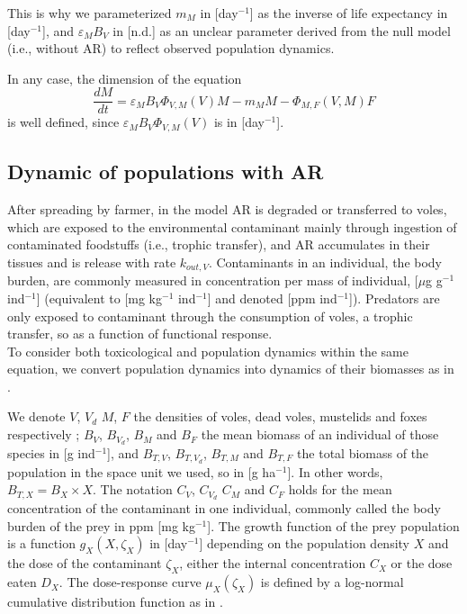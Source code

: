 \documentclass[11pt]{article}
\begin{document}
This is why we parameterized $m_M$ in [day$^{-1}$] as the inverse of life expectancy in [day$^{-1}$], and $\varepsilon_M B_V$ in [n.d.] as an unclear parameter derived from the null model (i.e., without AR) to reflect observed population dynamics. 

In any case, the dimension of the equation
\begin{equation}
\dfrac{dM}{dt}  = \varepsilon_M B_V \Phi_{V,M}(V)M - m_M M - \Phi_{M,F}(V,M)F
\label{eq:dynamic_M}
\end{equation}
%
is well defined, since $\varepsilon_M B_V \Phi_{V,M}(V)$ is in [day$^{-1}$].

\subsection{Dynamic of populations with AR}

After spreading by farmer, in the model AR is degraded or transferred to voles, which are exposed to the environmental contaminant mainly through ingestion of contaminated foodstuffs (i.e., trophic transfer), and AR accumulates in their tissues and is release with rate $k_{out,V}$.
%
Contaminants in an individual, the body burden, are commonly measured in concentration per mass of individual, [$\mu$g g$^{-1}$ ind$^{-1}$] (equivalent to [mg kg$^{-1}$ ind$^{-1}$] and denoted [ppm ind$^{-1}$]).
%
Predators are only exposed to contaminant through the consumption of voles, a trophic transfer, so as a function of functional response.
\\


To consider both toxicological and population dynamics within the same equation, we convert population dynamics into dynamics of their biomasses as in \citep{Huang2015EcoTox, Baudrot2018}.

We denote $V$, $V_d$ $M$, $F$ the densities of voles, dead voles, mustelids and foxes respectively ; $B_V$, $B_{V_d}$, $B_M$ and $B_F$ the mean biomass of an individual of those species in [g ind$^{-1}$], and $B_{T,V}$, $B_{T,V_d}$, $B_{T,M}$ and $B_{T,F}$ the total biomass of the population in the space unit we used, so in [g ha$^{-1}$]. In other words, $B_{T,X} = B_X \times X$. The notation $C_V$, $C_{V_d}$ $C_M$ and $C_F$ holds for the mean concentration of the contaminant in one individual, commonly called the body burden of the prey in ppm [mg kg$^{-1}$].
%
The growth function of the prey population is a function $g_X(X, \zeta_X)$ in [day$^{-1}$] depending on the population density $X$ and the dose of the contaminant $\zeta_X$, either the internal concentration $C_X$ or the dose eaten $D_X$.
%
The dose-response curve $\mu_X(\zeta_X)$ is defined by a log-normal cumulative distribution function as in \cite{Loos2010}.
\end{document}
